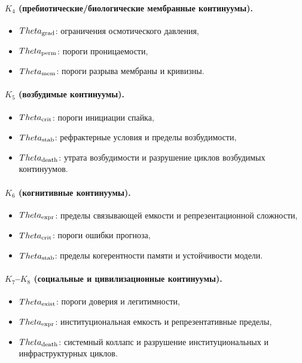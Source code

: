 \paragraph{\texorpdfstring{\(K_4\)}{K_4} (пребиотические/биологические мембранные континуумы).}
\begin{itemize}
    \item \(\Theta_{\rm grad}\): ограничения осмотического давления,
    \item \(\Theta_{\rm perm}\): пороги проницаемости,
    \item \(\Theta_{\rm mem}\): пороги разрыва мембраны и кривизны.
\end{itemize}

\paragraph{\texorpdfstring{\(K_5\)}{K_5} (возбудимые континуумы).}
\begin{itemize}
    \item \(\Theta_{\rm crit}\): пороги инициации спайка,
    \item \(\Theta_{\rm stab}\): рефрактерные условия и пределы возбудимости,
    \item \(\Theta_{\rm death}\): утрата возбудимости и разрушение
          циклов возбудимых континуумов.
\end{itemize}

\paragraph{\texorpdfstring{\(K_6\)}{K_6} (когнитивные континуумы).}
\begin{itemize}
    \item \(\Theta_{\rm expr}\): пределы связывающей емкости и репрезентационной
          сложности,
    \item \(\Theta_{\rm crit}\): пороги ошибки прогноза,
    \item \(\Theta_{\rm stab}\): пределы когерентности памяти и устойчивости модели.
\end{itemize}

\paragraph{\texorpdfstring{\(K_7\)}{K_7}–\texorpdfstring{\(K_8\)}{K_8} (социальные и цивилизационные континуумы).}
\begin{itemize}
    \item \(\Theta_{\rm exist}\): пороги доверия и легитимности,
    \item \(\Theta_{\rm expr}\): институциональная емкость и репрезентативные пределы,
    \item \(\Theta_{\rm death}\): системный коллапс и разрушение
          институциональных и инфраструктурных циклов.
\end{itemize}

